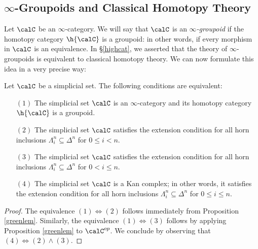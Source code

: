 \subsection{$\infty$-Groupoids and Classical Homotopy Theory}

Let $\calC$ be an $\infty$-category. We will say that $\calC$ is an {\it $\infty$-groupoid} if the homotopy category $\h{\calC}$ is a groupoid: in other words, if every morphism in $\calC$ is an equivalence. In \S \ref{highcat}, we asserted that the theory of $\infty$-groupoids is equivalent to classical homotopy theory. We can now formulate this idea in a very precise way:

\begin{proposition}\label{greenwich}
Let $\calC$ be a simplicial set. The following conditions are
equivalent:

\begin{itemize}
\item[$(1)$] The simplicial set $\calC$ is an $\infty$-category and its homotopy category $\h{\calC}$ is a groupoid.

\item[$(2)$] The simplicial set $\calC$ satisfies the extension condition
for all horn inclusions $\Lambda^n_i \subseteq \Delta^n$ for $0 \leq i < n$.

\item[$(3)$] The simplicial set $\calC$ satisfies the extension condition
for all horn inclusions $\Lambda^n_i \subseteq \Delta^n$ for $0 < i \leq n$.

\item[$(4)$] The simplicial set $\calC$ is a Kan complex; in other words, it
satisfies the extension condition for all horn inclusions
$\Lambda^n_i \subseteq \Delta^n$ for $0 \leq i \leq n$.
\end{itemize}
\end{proposition}

\begin{proof}
The equivalence $(1) \Leftrightarrow (2)$ follows immediately from
Proposition \ref{greenlem}.
Similarly, the equivalence $(1) \Leftrightarrow (3)$ follows by applying Proposition \ref{greenlem} to $\calC^{op}$. We conclude by observing that $(4) \Leftrightarrow (2) \wedge (3)$.
\end{proof}

